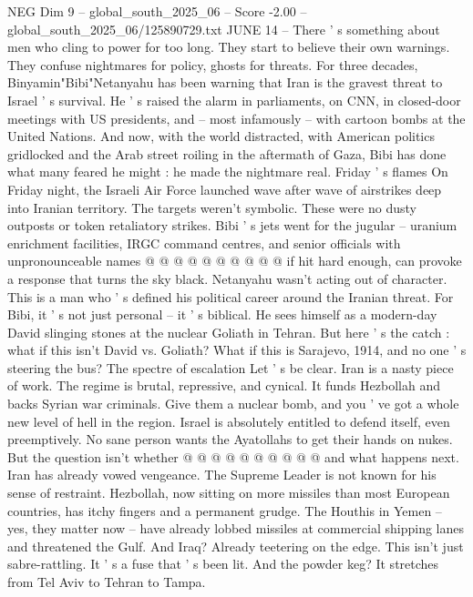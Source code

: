 \begin{textsample}{NEG Dim 9 – global\_south\_2025\_06 – Score -2.00 – global\_south\_2025\_06/125890729.txt}  \label{ex:f9_neg_285}
JUNE 14 -- There ' s something about men who cling to power for too long.
They start to believe their own warnings.
They confuse nightmares for policy, ghosts for threats.
For three decades, Binyamin"Bibi"Netanyahu has been warning that Iran is the gravest threat to Israel ' s survival.
He ' s raised the alarm in parliaments, on CNN, in closed-door meetings with US presidents, and -- most infamously -- with cartoon bombs at the United Nations.
And now, with the world distracted, with American politics gridlocked and the Arab street roiling in the aftermath of Gaza, Bibi has done what many feared he might : he made the nightmare real.
Friday ' s flames On Friday night, the Israeli Air Force launched wave after wave of airstrikes deep into Iranian territory.
The targets weren't symbolic.
These were no dusty outposts or token retaliatory strikes.
Bibi ' s jets went for the jugular -- uranium enrichment facilities, IRGC command centres, and senior officials with unpronounceable names @ @ @ @ @ @ @ @ @ @ if hit hard enough, can provoke a response that turns the sky black.
Netanyahu wasn't acting out of character.
This is a man who ' s defined his political career around the Iranian threat.
For Bibi, it ' s not just personal -- it ' s biblical.
He sees himself as a modern-day David slinging stones at the nuclear Goliath in Tehran.
But here ' s the catch : what if this isn't David vs.
Goliath?
What if this is Sarajevo, 1914, and no one ' s steering the bus?
The spectre of escalation Let ' s be clear.
Iran is a nasty piece of work.
The regime is brutal, repressive, and cynical.
It funds Hezbollah and backs Syrian war criminals.
Give them a nuclear bomb, and you ' ve got a whole new level of hell in the region.
Israel is absolutely entitled to defend itself, even preemptively.
No sane person wants the Ayatollahs to get their hands on nukes.
But the question isn't whether @ @ @ @ @ @ @ @ @ @ and what happens next.
Iran has already vowed vengeance.
The Supreme Leader is not known for his sense of restraint.
Hezbollah, now sitting on more missiles than most European countries, has itchy fingers and a permanent grudge.
The Houthis in Yemen -- yes, they matter now -- have already lobbed missiles at commercial shipping lanes and threatened the Gulf.
And Iraq?
Already teetering on the edge.
This isn't just sabre-rattling.
It ' s a fuse that ' s been lit.
And the powder keg?
It stretches from Tel Aviv to Tehran to Tampa.

\end{textsample}
